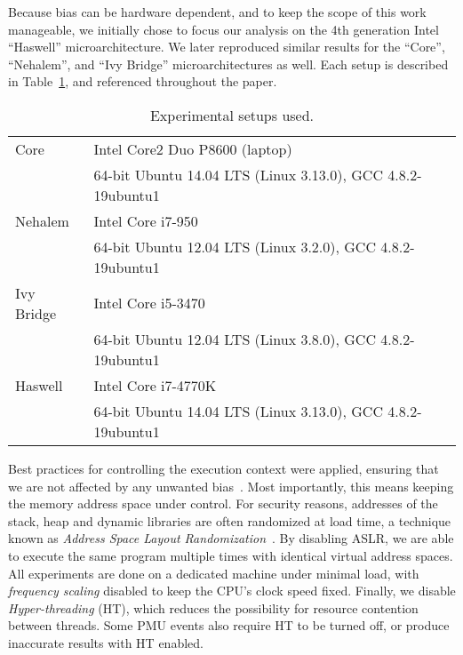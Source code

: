 \documentclass{acm_proc_article-sp}
\begin{document}
Because bias can be hardware dependent, and to keep the scope of this work manageable, we initially chose to focus our analysis on the 4th generation Intel ``Haswell'' microarchitecture.
We later reproduced similar results for the ``Core'', ``Nehalem'', and ``Ivy Bridge'' microarchitectures as well.
Each setup is described in Table~\ref{tab:machines}, and referenced throughout the paper.

\begin{table}
  \caption{Experimental setups used.\label{tab:machines}}{
  \begin{tabular}{|l|l|}
    \hline
Core          & Intel\textsuperscript{\textregistered{}} Core\texttrademark{}2 Duo P8600 (laptop) \\
              & 64-bit Ubuntu 14.04 LTS (Linux 3.13.0), GCC 4.8.2-19ubuntu1 \\ \hline
Nehalem       & Intel\textsuperscript{\textregistered{}} Core\texttrademark{} i7-950 \\
              & 64-bit Ubuntu 12.04 LTS (Linux 3.2.0), GCC 4.8.2-19ubuntu1 \\ \hline
Ivy Bridge    & Intel\textsuperscript{\textregistered{}} Core\texttrademark{} i5-3470 \\
              & 64-bit Ubuntu 12.04 LTS (Linux 3.8.0), GCC 4.8.2-19ubuntu1 \\ \hline
Haswell       & Intel\textsuperscript{\textregistered{}} Core\texttrademark{} i7-4770K \\
              & 64-bit Ubuntu 14.04 LTS (Linux 3.13.0), GCC 4.8.2-19ubuntu1 \\ \hline
  \end{tabular}}
\end{table}

Best practices for controlling the execution context were applied, ensuring that we are not affected by any unwanted bias~\cite{Mytkowicz:2009:WrongData}.
Most importantly, this means keeping the memory address space under control.
For security reasons, addresses of the stack, heap and dynamic libraries are often randomized at load time, a technique known as \emph{Address Space Layout Randomization}~\cite{Pax:ASLR,Bhatkar:AddressObfuscation}. 
By disabling ASLR, we are able to execute the same program multiple times with identical virtual address spaces.
All experiments are done on a dedicated machine under minimal load, with \emph{frequency scaling} disabled to keep the CPU's clock speed fixed.
Finally, we disable \emph{Hyper-threading} (HT), which reduces the possibility for resource contention between threads.
Some PMU events also require HT to be turned off, or produce inaccurate results with HT enabled.
\end{document}
